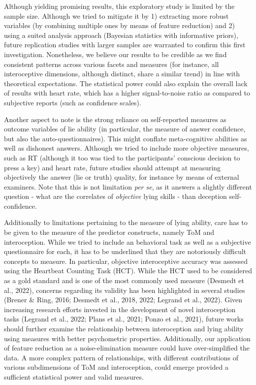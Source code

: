 \documentclass[
  man,floatsintext]{apa6}
\begin{document}
Although yielding promising results, this exploratory study is limited by the sample size. Although we tried to mitigate it by 1) extracting more robust variables (by combining multiple ones by means of feature reduction) and 2) using a suited analysis approach (Bayesian statistics with informative priors), future replication studies with larger samples are warranted to confirm this first investigation. Nonetheless, we believe our results to be credible as we find consistent patterns across various facets and measures (for instance, all interoceptive dimensions, although distinct, share a similar trend) in line with theoretical expectations. The statistical power could also explain the overall lack of results with heart rate, which has a higher signal-to-noise ratio as compared to subjective reports (such as confidence scales).

Another aspect to note is the strong reliance on self-reported measures as outcome variables of lie ability (in particular, the measure of answer confidence, but also the auto-questionnaires). This might conflate meta-cognitive abilities as well as dishonest answers. Although we tried to include more objective measures, such as RT (although it too was tied to the participants' conscious decision to press a key) and heart rate, future studies should attempt at measuring objectively the answer (lie or truth) quality, for instance by means of external examiners. Note that this is not limitation \emph{per se}, as it answers a slightly different question - what are the correlates of \emph{objective} lying skills - than deception self-confidence.

Additionally to limitations pertaining to the measure of lying ability, care has to be given to the measure of the predictor constructs, namely ToM and interoception. While we tried to include an behavioral task as well as a subjective questionnaire for each, it has to be underlined that they are notoriously difficult concepts to measure. In particular, objective interoceptive accuracy was assessed using the Heartbeat Counting Task (HCT). While the HCT used to be considered as a gold standard and is one of the most commonly used measure (Desmedt et al., 2022), concerns regarding its validity has been highlighted in several studies (Brener \& Ring, 2016; Desmedt et al., 2018, 2022; Legrand et al., 2022). Given increasing research efforts invested in the development of novel interoception tasks (Legrand et al., 2022; Plans et al., 2021; Ponzo et al., 2021), future works should further examine the relationship between interoception and lying ability using measures with better psychometric properties. Additionally, our application of feature reduction as a noise-elimination measure could have over-simplified the data. A more complex pattern of relationships, with different contributions of various subdimensions of ToM and interoception, could emerge provided a sufficient statistical power and valid measures.
\end{document}
